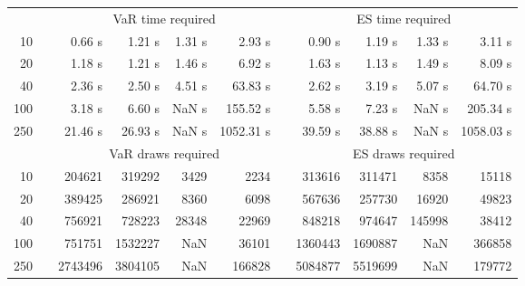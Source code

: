 {{\begin{longtable}{rr rrrr r rrrr}
\hline 
 & & \multicolumn{4}{c}{VaR time required} && \multicolumn{4}{c}{ES time required} \\ \cline{3-6}  \cline{8-11}
10 & & 0.66 s & 1.21 s & 1.31 s & 2.93 s && 0.90 s & 1.19 s & 1.33 s & 3.11 s \\ 
20 & & 1.18 s & 1.21 s & 1.46 s & 6.92 s && 1.63 s & 1.13 s & 1.49 s & 8.09 s \\ 
40 & & 2.36 s & 2.50 s & 4.51 s & 63.83 s && 2.62 s & 3.19 s & 5.07 s & 64.70 s \\ 
100 & & 3.18 s & 6.60 s &  NaN s & 155.52 s && 5.58 s & 7.23 s &  NaN s & 205.34 s \\ 
250 & & 21.46 s & 26.93 s &  NaN s & 1052.31 s && 39.59 s & 38.88 s &  NaN s & 1058.03 s \\ 
\hline 
 && \multicolumn{4}{c}{VaR draws required} &&   \multicolumn{4}{c}{ES draws required} \\  \cline{3-6}  \cline{8-11} 
10 & & 204621 & 319292 & 3429 & 2234 && 313616 & 311471 & 8358  & 15118 \\ 
20 & & 389425 & 286921 & 8360 & 6098 && 567636 & 257730 & 16920  & 49823 \\ 
40 & & 756921 & 728223 & 28348 & 22969 && 848218 & 974647 & 145998  & 38412 \\ 
100 & & 751751 & 1532227 & NaN & 36101 && 1360443 & 1690887 & NaN  & 366858 \\ 
250 & & 2743496 & 3804105 & NaN & 166828 && 5084877 & 5519699 & NaN  & 179772 \\ 
\hline 
\end{longtable} 
} 
} 
